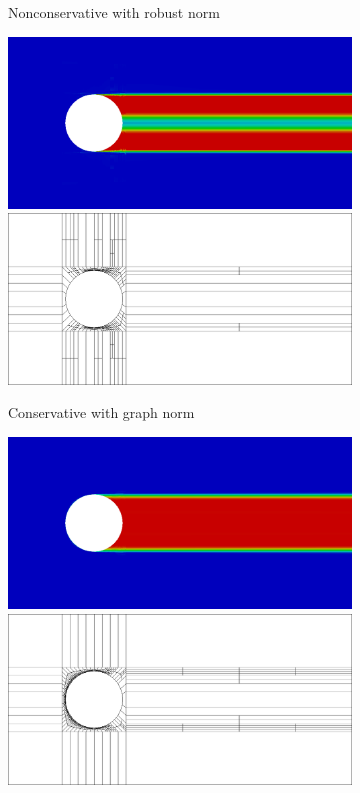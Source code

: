 \documentclass[letterpaper]{article}
\begin{document}
\begin{figure}
\begin{subfigure}[t]{0.45\textwidth}
\caption{Nonconservative with robust norm}
\label{fig:hemkerRobust4nc}
\end{subfigure}
\begin{subfigure}[t]{0.45\textwidth}
\centering
\includegraphics[width=\textwidth]{figs/Hemker/graph4c.png}
\includegraphics[width=\textwidth]{figs/Hemker/graph4c_mesh.png}
\caption{Conservative with graph norm}
\label{fig:hemkerGraph4c}
\end{subfigure}
\begin{subfigure}[t]{0.45\textwidth}
\centering
\includegraphics[width=\textwidth]{figs/Hemker/robust4c.png}
\includegraphics[width=\textwidth]{figs/Hemker/robust4c_mesh.png}

\end{subfigure}
\end{figure}
\end{document}
